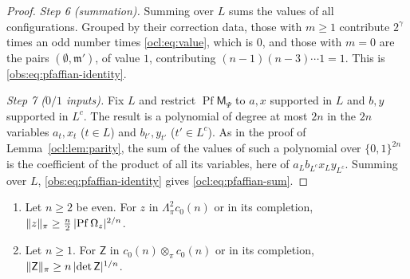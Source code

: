 \begin{proof}
\emph{Step 6 (summation).} Summing over $L$ sums the values of all configurations. Grouped by their correction data,
those with $m\ge1$ contribute $2^\gamma$ times an odd number times \eqref{ocl:eq:value}, which is $0$, and those with
$m=0$ are the pairs $(\emptyset,\mathfrak m')$, of value $1$, contributing $(n-1)(n-3)\cdots1=1$. This is
\eqref{obs:eq:pfaffian-identity}.

\emph{Step 7 ($0/1$ inputs).} Fix $L$ and restrict $\operatorname{Pf}\mathsf M_\Psi$ to $a,x$ supported in $L$ and $b,y$
supported in $L^c$. The result is a polynomial of degree at most $2n$ in the $2n$ variables $a_t,x_t$ ($t\in L$) and
$b_{t'},y_{t'}$ ($t'\in L^c$). As in the proof of Lemma~\ref{ocl:lem:parity}, the sum of the values of such a polynomial over
$\{0,1\}^{2n}$ is the coefficient of the product of all its variables, here of $a_Lb_{L^c}x_Ly_{L^c}$. Summing over $L$,
\eqref{obs:eq:pfaffian-identity} gives \eqref{ocl:eq:pfaffian-sum}.
\end{proof}

\begin{lemma}\label{ocl:lem:pfaffian-bound}
\leavevmode
\begin{enumerate}
\item Let $n\ge2$ be even. For $z$ in $\Lambda^2_\pi c_0(n)$ or in its completion, $\lVert z\rVert_\pi\ge\frac n2\,
\lvert \operatorname{Pf}\Omega_z\rvert^{2/n}$.
\item Let $n\ge1$. For $\mathsf Z$ in $c_0(n)\otimes_\pi c_0(n)$ or in its completion, $\lVert \mathsf Z\rVert_\pi\ge n\,
\lvert \det\mathsf Z\rvert^{1/n}$.
\end{enumerate}
\end{lemma}

